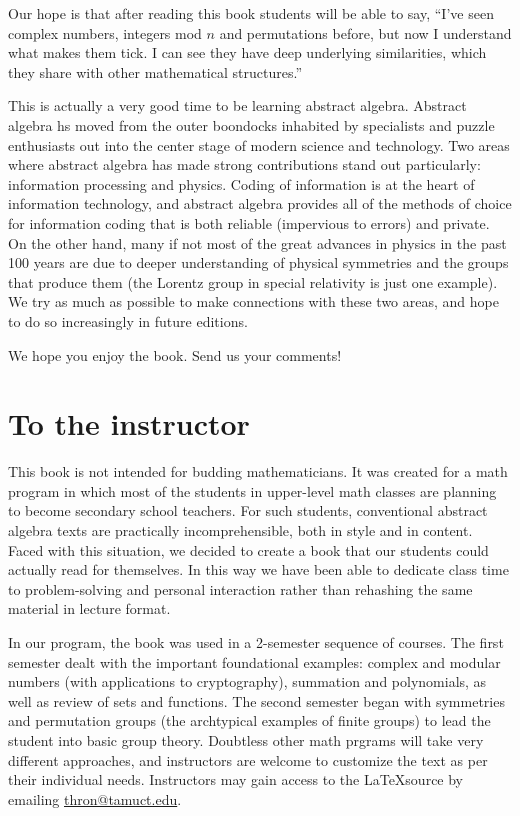 Our hope is that after reading this book students will be able to say, ``I've seen complex numbers, integers mod $n$ and permutations before, but now I understand what makes them tick. I can see they have  deep underlying similarities, which they share with other mathematical structures.'' 

This is actually a very good time to be learning abstract algebra. Abstract algebra hs moved from the outer boondocks inhabited by specialists and puzzle enthusiasts out  into the center stage of modern  science and technology. Two areas where abstract algebra has made strong contributions stand out particularly: information processing and physics. Coding of information is at the heart of information technology, and abstract algebra provides all of the methods of choice for information coding that is both reliable (impervious to errors) and private.  
On the other hand,  many if not most of the great advances in  physics in the past 100 years are due to deeper understanding of physical symmetries and the groups that produce them (the Lorentz group in special relativity is just one example). We try as much as possible to make connections with these two areas, and hope to do so increasingly in future editions. 

We hope you enjoy the book. Send us your comments!

\section*{To the instructor}\label{sec:toInstructor}

This book  is not intended for budding mathematicians. It was created for a math program in which most of the students in upper-level math classes are planning to become secondary school teachers. For such students, conventional abstract algebra texts are practically  incomprehensible, both in style and in content. Faced with this situation, we decided to create a book that our students could actually read for themselves. In this way we have been able to dedicate class time to problem-solving and personal  interaction rather than rehashing the same material in lecture format.

In our program, the book was used in a 2-semester sequence of courses. The first semester dealt with the important foundational examples: complex  and modular numbers (with applications to cryptography), summation and polynomials, as well as review of sets and functions.  The second semester began with symmetries and permutation groups (the archtypical examples of finite groups) to lead the student into basic group theory. Doubtless other math prgrams will take very different approaches, and instructors are welcome to customize the text as per their individual needs. Instructors may gain access to the \LaTeX  source by emailing \href{mailto:thron@tamuct.edu}{thron@tamuct.edu}. 

